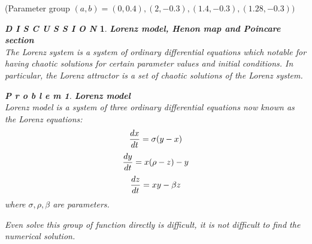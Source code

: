 \documentclass[12pt]{article}
\theoremstyle{plain}
\newtheorem{problem}{\textbf{P r o b l e m}}[section]
\newtheorem{discussion}{\textit{D I S C U S S I O N}}[section]
\begin{document}
(Parameter group $(a, b) = (0, 0.4), (2, -0.3), (1.4, -0.3), (1.28, -0.3))$








\begin{discussion} \textbf{Lorenz model, Henon map and Poincare section}
\\\noindent The Lorenz system is a system of ordinary differential equations which notable for having chaotic solutions for certain parameter values and initial conditions. In particular, the Lorenz attractor is a set of chaotic solutions of the Lorenz system.

\begin{problem}\textbf{Lorenz model}
\\\noindent Lorenz model is a system of three ordinary differential equations now known as the Lorenz equations:
$$
{dx \over dt} = \sigma(y - x)
$$
$$
{dy \over dt} = x(\rho - z) - y
$$
$$
{dz \over dt} = xy - \beta z
$$
where $\sigma, \rho, \beta$ are parameters.
\end{problem}

Even solve this group of function directly is difficult, it is not difficult to find the numerical solution. 


\end{discussion}
\end{document}
